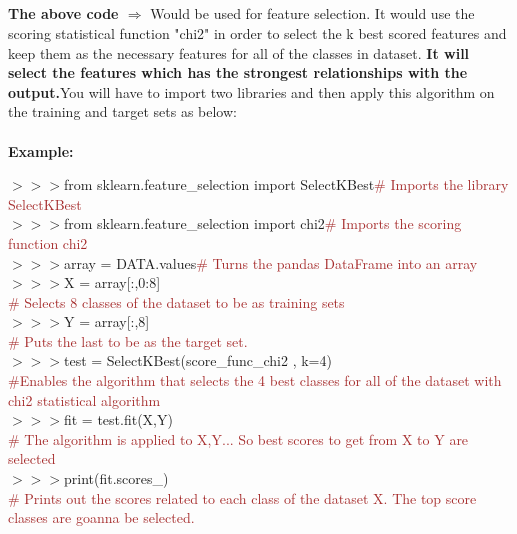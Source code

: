 \documentclass[a4paper,18pt]{article}
\begin{document}
\subsection{\colorbox {matgreen}{\color{white}{\large SelectKBest(score\_func=chi2,k=4)}}}
\textbf{The above code $\Rightarrow$} Would be used for feature selection. It would use the scoring statistical function "chi2" in order to select the k best scored features and keep them as the necessary features for all of the classes in dataset. {\textbf{\textcolor{important}{It will select the features which has the strongest relationships with the output.}}}You will have to import two libraries and then apply this algorithm on the training and target sets as below:\\\\
\textbf{Example:\\}

$>>>$from sklearn.feature\_selection import SelectKBest{\textcolor{brown}{\# Imports the library SelectKBest}}\\

$>>>$from sklearn.feature\_selection import chi2{\textcolor{brown}{\# Imports the scoring function chi2}}\\

$>>>$array = DATA.values{\textcolor{brown}{\# Turns the pandas DataFrame into an array}}\\

$>>>$X = array[:,0:8]\\{\textcolor{brown}{\# Selects 8 classes of the dataset to be as training sets}}\\

$>>>$Y = array[:,8]\\{\textcolor{brown}{\# Puts the last to be as the target set.}}\\

$>>>$test = SelectKBest(score\_func\_chi2 , k=4)\\{\textcolor{brown}{\#Enables the algorithm that selects the 4 best classes for all of the dataset with chi2 statistical algorithm}}\\

$>>>$fit = test.fit(X,Y)\\{\textcolor{brown}{\# The algorithm is applied to X,Y... So best scores to get from X to Y are selected}}\\

$>>>$print(fit.scores\_)\\{\textcolor{brown}{\# Prints out the scores related to each class of the dataset X. The top score classes are goanna be selected.}}\\
\end{document}
